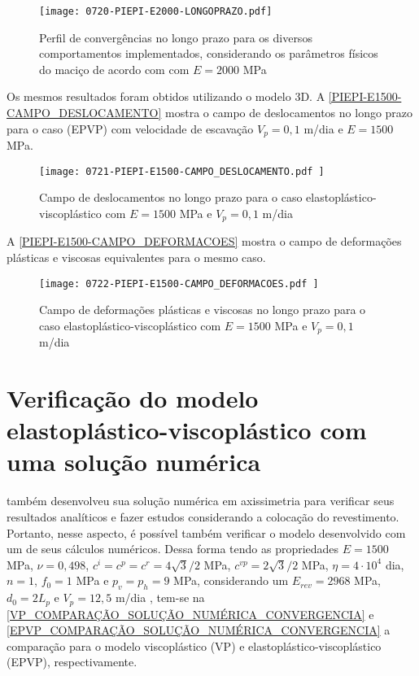 \begin{figure}[H]
	\begin{center}
		\texttt{[image: 0720-PIEPI-E2000-LONGOPRAZO.pdf]}
	\end{center}
	\caption{\label{PIEPI-E2000-LONGOPRAZO}Perfil de convergências no longo prazo para os diversos comportamentos implementados, considerando os parâmetros físicos do maciço de acordo com  com $E=2000$ MPa}
\end{figure}

Os mesmos resultados foram obtidos utilizando o modelo 3D. A \autoref{PIEPI-E1500-CAMPO_DESLOCAMENTO} mostra o campo de deslocamentos no longo prazo para o caso (EPVP) com velocidade de escavação $V_p=0,1$ m/dia e $E=1500$ MPa.

\begin{figure}[H]
	\begin{center}
		\texttt{[image: 0721-PIEPI-E1500-CAMPO\_DESLOCAMENTO.pdf
		]}
	\end{center}
	\caption{\label{PIEPI-E1500-CAMPO_DESLOCAMENTO}Campo de deslocamentos no longo prazo para o caso elastoplástico-viscoplástico com $E=1500$ MPa e $V_p=0,1$ m/dia}
\end{figure}

A \autoref{PIEPI-E1500-CAMPO_DEFORMACOES} mostra o campo de deformações plásticas e viscosas equivalentes para o mesmo caso.

\begin{figure}[H]
	\begin{center}
		\texttt{[image: 0722-PIEPI-E1500-CAMPO\_DEFORMACOES.pdf
		]}
	\end{center}
	\caption{\label{PIEPI-E1500-CAMPO_DEFORMACOES}Campo de deformações plásticas e viscosas no longo prazo para o caso elastoplástico-viscoplástico com $E=1500$ MPa e $V_p=0,1$ m/dia}
\end{figure}

\section{Verificação do modelo elastoplástico-viscoplástico com uma solução numérica}\label{cap: verificacao_epvp_com_solucao_numerica}

 também desenvolveu sua solução numérica em axissimetria para verificar seus resultados analíticos e fazer estudos considerando a colocação do revestimento. Portanto, nesse aspecto, é possível também verificar o modelo desenvolvido com um de seus cálculos numéricos. Dessa forma tendo as propriedades $E=1500$ MPa, $\nu=0,498$, $c^i=c^p=c^r =4\sqrt{3}/2$ MPa, $c^{vp}=2\sqrt{3}/2$ MPa, $\eta = 4 \cdot 10^4$ dia, $n=1$, $f_0=1$ MPa e $p_v=p_h=9$ MPa, considerando um $E_{rev} = 2968$ MPa, $d_0 = 2L_p$ e $V_p=12,5$ m/dia \cite[p. 128, 132]{Piepi1995}, tem-se na \autoref{VP_COMPARAÇÃO_SOLUÇÃO_NUMÉRICA_CONVERGENCIA} e \autoref{EPVP_COMPARAÇÃO_SOLUÇÃO_NUMÉRICA_CONVERGENCIA} a comparação para o modelo viscoplástico (VP) e elastoplástico-viscoplástico (EPVP), respectivamente.

